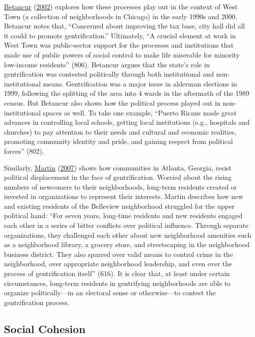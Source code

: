 \documentclass[
  12pt,
]{article}
\begin{document}
\protect\hyperlink{ref-Betancur2002}{Betancur} (\protect\hyperlink{ref-Betancur2002}{2002}) explores how these processes play out in the context of West Town (a collection of neighborhoods in Chicago) in the early 1990s and 2000. Betancur notes that, ``Concerned about improving the tax base, city hall did all it could to promote gentrification.'' Ultimately, ``A crucial element at work in West Town was public-sector support for the processes and institutions that made use of public powers of social control to make life miserable for minority low-income residents'' (806). Betancur argues that the state's role in gentrification was contested politically through both institutional and non-institutional means. Gentrification was a major issue in alderman elections in 1999, following the splitting of the area into 4 wards in the aftermath of the 1989 census. But Betancur also shows how the political process played out in non-institutional spaces as well. To take one example, ``Puerto Ricans made great advances in controlling local schools, getting local institutions (e.g., hospitals and churches) to pay attention to their needs and cultural and economic realities, promoting community identity and pride, and gaining respect from political forces'' (802).

Similarly, \protect\hyperlink{ref-Martin2007a}{Martin} (\protect\hyperlink{ref-Martin2007a}{2007}) shows how communities in Atlanta, Georgia, resist political displacement in the face of gentrification. Worried about the rising numbers of newcomers to their neighborhoods, long-term residents created or invested in organizations to represent their interests. Martin describes how new and existing residents of the Belleview neighborhood struggled for the upper political hand: ``For seven years, long-time residents and new residents engaged each other in a series of bitter conflicts over political influence. Through separate organizations, they challenged each other about new neighborhood amenities such as a neighborhood library, a grocery store, and streetscaping in the neighborhood business district. They also sparred over valid means to control crime in the neighborhood, over appropriate neighborhood leadership, and even over the process of gentrification itself'' (616). It is clear that, at least under certain circumstances, long-term residents in gentrifying neighborhoods are able to organize politically---in an electoral sense or otherwise---to contest the gentrification process.

\hypertarget{social-cohesion}{%
\subsection{Social Cohesion}\label{social-cohesion}}
\end{document}
